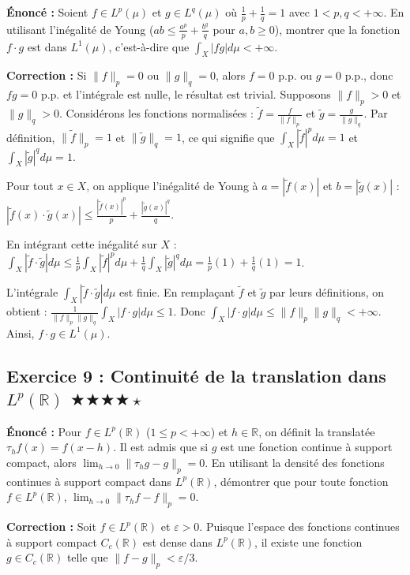 \documentclass[11pt,a4paper]{article}
\begin{document}
\textbf{Énoncé :}
Soient $f \in L^p(\mu)$ et $g \in L^q(\mu)$ où $\frac{1}{p} + \frac{1}{q} = 1$ avec $1 < p, q < +\infty$.
En utilisant l'inégalité de Young ($ab \le \frac{a^p}{p} + \frac{b^q}{q}$ pour $a,b \ge 0$), montrer que la fonction $f \cdot g$ est dans $L^1(\mu)$, c'est-à-dire que $\int_X |fg| d\mu < +\infty$.

\textbf{Correction :}
Si $\|f\|_p = 0$ ou $\|g\|_q = 0$, alors $f=0$ p.p. ou $g=0$ p.p., donc $fg = 0$ p.p. et l'intégrale est nulle, le résultat est trivial.
Supposons $\|f\|_p > 0$ et $\|g\|_q > 0$.
Considérons les fonctions normalisées : $\tilde{f} = \frac{f}{\|f\|_p}$ et $\tilde{g} = \frac{g}{\|g\|_q}$.
Par définition, $\|\tilde{f}\|_p = 1$ et $\|\tilde{g}\|_q = 1$, ce qui signifie que $\int_X |\tilde{f}|^p d\mu = 1$ et $\int_X |\tilde{g}|^q d\mu = 1$.

Pour tout $x \in X$, on applique l'inégalité de Young à $a = |\tilde{f}(x)|$ et $b = |\tilde{g}(x)|$ :
$|\tilde{f}(x) \cdot \tilde{g}(x)| \le \frac{|\tilde{f}(x)|^p}{p} + \frac{|\tilde{g}(x)|^q}{q}$.

En intégrant cette inégalité sur $X$ :
$\int_X |\tilde{f} \cdot \tilde{g}| d\mu \le \frac{1}{p} \int_X |\tilde{f}|^p d\mu + \frac{1}{q} \int_X |\tilde{g}|^q d\mu = \frac{1}{p}(1) + \frac{1}{q}(1) = 1$.

L'intégrale $\int_X |\tilde{f} \cdot \tilde{g}| d\mu$ est finie.
En remplaçant $\tilde{f}$ et $\tilde{g}$ par leurs définitions, on obtient :
$\frac{1}{\|f\|_p \|g\|_q} \int_X |f \cdot g| d\mu \le 1$.
Donc $\int_X |f \cdot g| d\mu \le \|f\|_p \|g\|_q < +\infty$.
Ainsi, $f \cdot g \in L^1(\mu)$.


\subsection*{Exercice 9 : Continuité de la translation dans $L^p(\mathbb{R})$ \quad $\bigstar\bigstar\bigstar\bigstar\star$}

\textbf{Énoncé :}
Pour $f \in L^p(\mathbb{R})$ ($1 \le p < +\infty$) et $h \in \mathbb{R}$, on définit la translatée $\tau_h f(x) = f(x - h)$.
Il est admis que si $g$ est une fonction continue à support compact, alors $\lim_{h \to 0} \|\tau_h g - g\|_p = 0$.
En utilisant la densité des fonctions continues à support compact dans $L^p(\mathbb{R})$, démontrer que pour toute fonction $f \in L^p(\mathbb{R})$, $\lim_{h \to 0} \|\tau_h f - f\|_p = 0$.

\textbf{Correction :}
Soit $f \in L^p(\mathbb{R})$ et $\varepsilon > 0$.
Puisque l'espace des fonctions continues à support compact $C_c(\mathbb{R})$ est dense dans $L^p(\mathbb{R})$, il existe une fonction $g \in C_c(\mathbb{R})$ telle que $\|f - g\|_p < \varepsilon / 3$.
\end{document}

